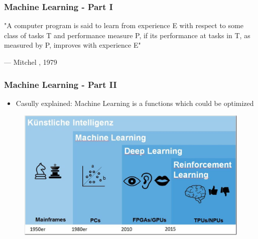 \documentclass{beamer}
\begin{document}
\begin{frame}
\frametitle{Machine Learning - Part I}
\epigraph{"A computer program is said to learn from experience E with respect to some class of tasks T and performance measure P, if its performance at tasks in T, as measured by P, improves with experience E"}{--- \textup{Mitchel }, 1979}
\end{frame}
%
%
\begin{frame}
\frametitle{Machine Learning - Part II}
\begin{itemize}
\item Casully explained: Machine Learning is a functions which could be optimized
\end{itemize}
\begin{figure}
\includegraphics[width=0.8\linewidth]{photo/history}
\end{figure}
\end{frame}
\end{document}
